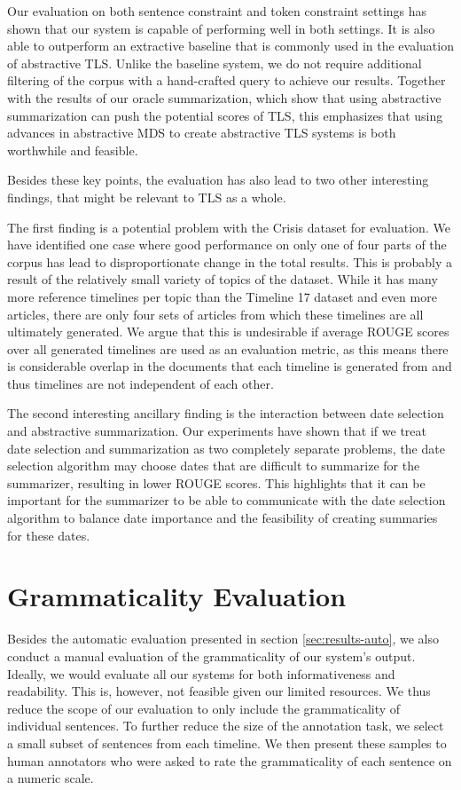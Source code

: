 \documentclass[a4paper,BCOR=10mm]{report}
\numberwithin{lemma}{chapter}
\numberwithin{definition}{chapter}
\begin{document}
Our evaluation on both sentence constraint and token constraint settings has shown that our system is capable of performing well in both settings. It is also able to outperform an extractive baseline that is commonly used in the evaluation of abstractive TLS.
Unlike the baseline system, we do not require additional filtering of the corpus with a hand-crafted query to achieve our results.
Together with the results of our oracle summarization, which show that using abstractive summarization can push the potential scores of TLS, this emphasizes that using advances in abstractive MDS to create abstractive TLS systems is both worthwhile and feasible.

Besides these key points, the evaluation has also lead to two other interesting findings, that might be relevant to TLS as a whole.

The first finding is a potential problem with the Crisis dataset for evaluation.
We have identified one case where good performance on only one of four parts of the corpus has lead to disproportionate change in the total results.
This is probably a result of the relatively small variety of topics of the dataset. While it has many more reference timelines per topic than the Timeline 17 dataset and even more articles, there are only four sets of articles from which these timelines are all ultimately generated. We argue that this is undesirable if average ROUGE scores over all generated timelines are used as an evaluation metric, as this means there is considerable overlap in the documents that each timeline is generated from and thus timelines are not independent of each other.

The second interesting ancillary finding is the interaction between date selection and abstractive summarization.
Our experiments have shown that if we treat date selection and summarization as two completely separate problems, the date selection algorithm may choose dates that are difficult to summarize for the summarizer, resulting in lower ROUGE scores. This highlights that it can be important for the summarizer to be able to communicate with the date selection algorithm to balance date importance and the feasibility of creating summaries for these dates.

\chapter{Grammaticality Evaluation} \label{sec:results-manual}

Besides the automatic evaluation presented in section \ref{sec:results-auto}, we also conduct a manual evaluation of the grammaticality of our system's output.
Ideally, we would evaluate all our systems for both informativeness and readability. This is, however, not feasible given our limited resources.
We thus reduce the scope of our evaluation to only include the grammaticality of individual sentences.
To further reduce the size of the annotation task, we select a small subset of sentences from each timeline.
We then present these samples to human annotators who were asked to rate the grammaticality of each sentence on a numeric scale.
\end{document}
